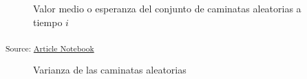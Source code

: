 \documentclass[
  letterpaper,
  DIV=11,
  numbers=noendperiod]{scrartcl}
\begin{document}
\begin{figure}[H]


\caption{\label{fig-valor-medio}Valor medio o esperanza del conjunto de
caminatas aleatorias a tiempo \(i\)}

\end{figure}%

\textsubscript{Source:
\href{https://akielbowicz.github.io/pyday-la-plata-2024/index.qmd.html}{Article
Notebook}}

\begin{figure}[H]


\caption{\label{fig-varianza}Varianza de las caminatas aleatorias}

\end{figure}%
\end{document}
